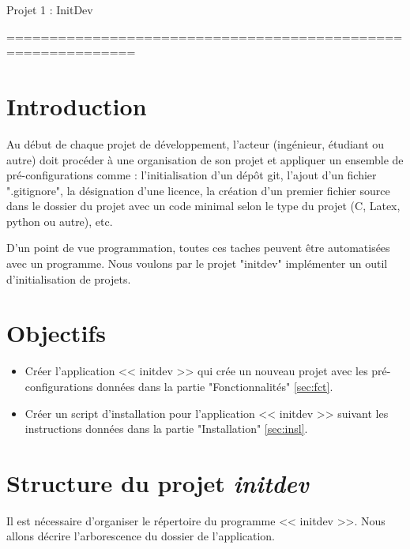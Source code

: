 \documentclass[10pt,a4paper]{article}
\begin{document}
\begin{center}
\huge{Projet 1 : InitDev}
\end{center}
=============================================================

\section{Introduction}
Au début de chaque projet de développement, l'acteur (ingénieur, étudiant ou autre) doit procéder à une organisation de son projet et appliquer un ensemble de pré-configurations comme : l'initialisation d'un dépôt git, l'ajout d'un fichier ".gitignore", la désignation d'une licence, la création d'un premier fichier source dans le dossier du projet avec un code minimal selon le type du projet (C, Latex, python ou autre), etc.

D'un point de vue programmation, toutes ces taches peuvent être automatisées avec un programme. Nous voulons par le projet "initdev" implémenter un outil d'initialisation de projets. 

\section{Objectifs}
\begin{itemize}
\item Créer l'application << initdev >> qui crée un nouveau projet avec les pré-configurations données dans la partie "Fonctionnalités" \ref{sec:fct}.
\item Créer un script d'installation pour l'application << initdev >> suivant les instructions données dans la partie "Installation" \ref{sec:insl}. 
\end{itemize}

\section{Structure du projet \emph{initdev}}
Il est nécessaire d'organiser le répertoire du programme << initdev >>. Nous allons décrire l'arborescence du dossier de l'application.
\end{document}
